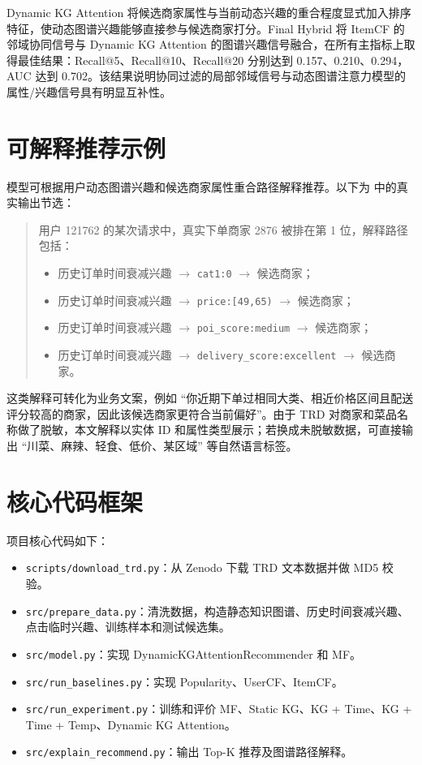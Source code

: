 \documentclass[UTF8,a4paper,12pt]{ctexart}
\begin{document}
Dynamic KG Attention 将候选商家属性与当前动态兴趣的重合程度显式加入排序特征，使动态图谱兴趣能够直接参与候选商家打分。Final Hybrid 将 ItemCF 的邻域协同信号与 Dynamic KG Attention 的图谱兴趣信号融合，在所有主指标上取得最佳结果：Recall@5、Recall@10、Recall@20 分别达到 0.157、0.210、0.294，AUC 达到 0.702。该结果说明协同过滤的局部邻域信号与动态图谱注意力模型的属性/兴趣信号具有明显互补性。

\section{可解释推荐示例}

模型可根据用户动态图谱兴趣和候选商家属性重合路径解释推荐。以下为  中的真实输出节选：

\begin{quote}
用户 121762 的某次请求中，真实下单商家 2876 被排在第 1 位，解释路径包括：
\begin{itemize}
  \item 历史订单时间衰减兴趣 $\rightarrow$ \texttt{cat1:0} $\rightarrow$ 候选商家；
  \item 历史订单时间衰减兴趣 $\rightarrow$ \texttt{price:[49,65)} $\rightarrow$ 候选商家；
  \item 历史订单时间衰减兴趣 $\rightarrow$ \texttt{poi\_score:medium} $\rightarrow$ 候选商家；
  \item 历史订单时间衰减兴趣 $\rightarrow$ \texttt{delivery\_score:excellent} $\rightarrow$ 候选商家。
\end{itemize}
\end{quote}

这类解释可转化为业务文案，例如 ``你近期下单过相同大类、相近价格区间且配送评分较高的商家，因此该候选商家更符合当前偏好''。由于 TRD 对商家和菜品名称做了脱敏，本文解释以实体 ID 和属性类型展示；若换成未脱敏数据，可直接输出 ``川菜、麻辣、轻食、低价、某区域'' 等自然语言标签。

\section{核心代码框架}

项目核心代码如下：

\begin{itemize}
  \item \texttt{scripts/download\_trd.py}：从 Zenodo 下载 TRD 文本数据并做 MD5 校验。
  \item \texttt{src/prepare\_data.py}：清洗数据，构造静态知识图谱、历史时间衰减兴趣、点击临时兴趣、训练样本和测试候选集。
  \item \texttt{src/model.py}：实现 DynamicKGAttentionRecommender 和 MF。
  \item \texttt{src/run\_baselines.py}：实现 Popularity、UserCF、ItemCF。
  \item \texttt{src/run\_experiment.py}：训练和评价 MF、Static KG、KG + Time、KG + Time + Temp、Dynamic KG Attention。
  \item \texttt{src/explain\_recommend.py}：输出 Top-K 推荐及图谱路径解释。
\end{itemize}
\end{document}
